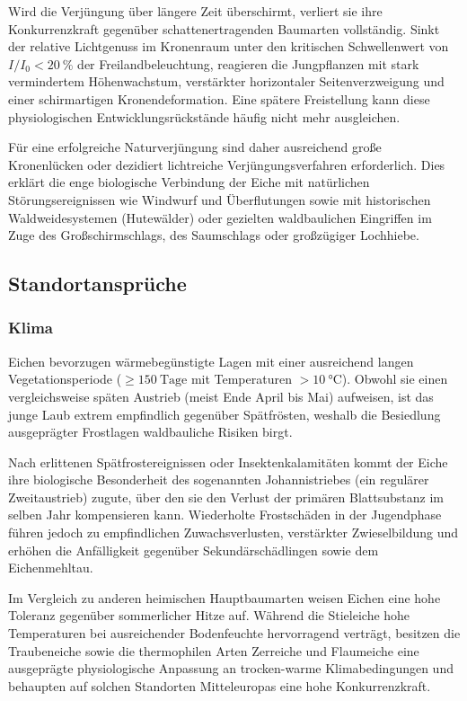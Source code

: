 \documentclass[twocolumn, bibliography=totoc, abstract=true]{scrartcl}
\begin{document}
Wird die Verjüngung über längere Zeit überschirmt, verliert sie ihre Konkurrenzkraft gegenüber schattenertragenden Baumarten vollständig. Sinkt der relative Lichtgenuss im Kronenraum unter den kritischen Schwellenwert von $I/I_0 < \qty{20}{\%}$ der Freilandbeleuchtung, reagieren die Jungpflanzen mit stark vermindertem Höhenwachstum, verstärkter horizontaler Seitenverzweigung und einer schirmartigen Kronendeformation. Eine spätere Freistellung kann diese physiologischen Entwicklungsrückstände häufig nicht mehr ausgleichen.

Für eine erfolgreiche Naturverjüngung sind daher ausreichend große Kronenlücken oder dezidiert lichtreiche Verjüngungsverfahren erforderlich. Dies erklärt die enge biologische Verbindung der Eiche mit natürlichen Störungsereignissen wie Windwurf und Überflutungen sowie mit historischen Waldweidesystemen (Hutewälder) oder gezielten waldbaulichen Eingriffen im Zuge des Großschirmschlags, des Saumschlags oder großzügiger Lochhiebe.

\subsection{Standortansprüche}

\subsubsection{Klima}

Eichen bevorzugen wärmebegünstigte Lagen mit einer ausreichend langen Vegetationsperiode ($\ge \qty{150}{\text{Tage}}$ mit Temperaturen $> \qty{10}{\celsius}$). Obwohl sie einen vergleichsweise späten Austrieb (meist Ende April bis Mai) aufweisen, ist das junge Laub extrem empfindlich gegenüber Spätfrösten, weshalb die Besiedlung ausgeprägter Frostlagen waldbauliche Risiken birgt.

Nach erlittenen Spätfrostereignissen oder Insektenkalamitäten kommt der Eiche ihre biologische Besonderheit des sogenannten Johannistriebes (ein regulärer Zweitaustrieb) zugute, über den sie den Verlust der primären Blattsubstanz im selben Jahr kompensieren kann. Wiederholte Frostschäden in der Jugendphase führen jedoch zu empfindlichen Zuwachsverlusten, verstärkter Zwieselbildung und erhöhen die Anfälligkeit gegenüber Sekundärschädlingen sowie dem Eichenmehltau.

Im Vergleich zu anderen heimischen Hauptbaumarten weisen Eichen eine hohe Toleranz gegenüber sommerlicher Hitze auf. Während die Stieleiche hohe Temperaturen bei ausreichender Bodenfeuchte hervorragend verträgt, besitzen die Traubeneiche sowie die thermophilen Arten Zerreiche und Flaumeiche eine ausgeprägte physiologische Anpassung an trocken-warme Klimabedingungen und behaupten auf solchen Standorten Mitteleuropas eine hohe Konkurrenzkraft.
\end{document}
